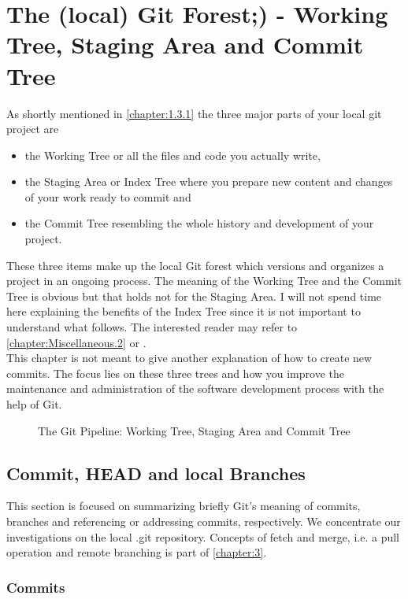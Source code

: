 \chapter{The (local) Git Forest;) - Working Tree, Staging Area and Commit Tree}
\label{chapter:2}

As shortly mentioned in \cref{chapter:1.3.1} the three major parts of your local git project are
\begin{itemize}
	\item the Working Tree or all the files and code you actually write,
	\item the Staging Area or Index Tree where you prepare new content and changes of your work ready to commit and 
	\item the Commit Tree resembling the whole history and development of your project. 
\end{itemize}
These three items make up the local Git forest which versions and organizes a project in an ongoing process. The meaning of the Working Tree and the 
Commit Tree is obvious but that holds not for the Staging Area. I will not spend time here explaining the benefits of the Index Tree 
since it is not important to understand what follows. The interested reader may refer to \cref{chapter:Miscellaneous.2} or 
\cite{sonulohaniWhat2021}. 
\\
This chapter is not meant to give another explanation of how to create new commits. The focus lies on these three trees 
and how you improve the maintenance and administration of the software development process with the help of Git. 
\begin{figure}[H]
	\centering
	
	\caption{The Git Pipeline: Working Tree, Staging Area and Commit Tree}
	\label{fig:GitPipe}
\end{figure}

 


\section{Commit, HEAD and local Branches}
\label{chapter:2.1}

This section is focused on summarizing briefly Git's meaning of commits, branches 
and referencing or addressing commits, respectively. We concentrate our investigations on the local 
.git repository. Concepts of fetch and merge, i.e. a pull operation and remote branching is part of \cref{chapter:3}. 



\subsection*{Commits}
  
